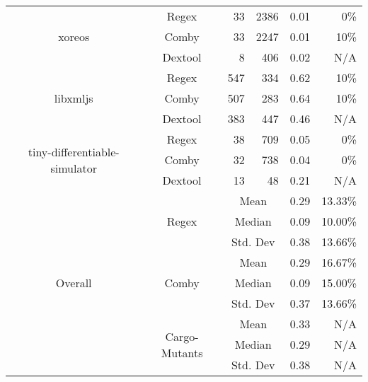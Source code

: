 \documentclass[sigconf,review, anonymous]{acmart}
\begin{document}
{\begin{table}[htbp]
{\begin{tabular}{|c|c|r|r|r|r|}
\multirow{3}{*}{\small xoreos} & Regex & 33 & 2386 & 0.01 & 0\% \\\cline{2-6}
    & Comby & 33 & 2247 & 0.01 & 10\% \\ \cline{2-6}
    & Dextool & 8 & 406 & 0.02 & N/A \\ \hline
\multirow{3}{*}{\small libxmljs} & Regex & 547 & 334 & 0.62 & 10\% \\\cline{2-6}
    & Comby & 507 & 283 & 0.64 & 10\% \\ \cline{2-6}
    & Dextool & 383 & 447 & 0.46 & N/A \\ \hline
\multirow{3}{*}{\small tiny-differentiable-simulator} & Regex & 38 & 709 & 0.05 & 0\% \\\cline{2-6}
    & Comby & 32 & 738 & 0.04 & 0\% \\ \cline{2-6}
    & Dextool & 13 & 48 & 0.21 & N/A\\ \hline
    
\multirow{9}{*}{Overall} & \multirow{3}{*}{Regex} & \multicolumn{2}{c|}{Mean} & 0.29  & 13.33\%\\\cline{3-6}
    &   &  \multicolumn{2}{c|}{Median} & 0.09 & 10.00\% \\\cline{3-6}
    &   &  \multicolumn{2}{c|}{Std. Dev} & 0.38 & 13.66\% \\\cline{2-6}

 & \multirow{3}{*}{Comby} & \multicolumn{2}{c|}{Mean} & 0.29 & 16.67\% \\\cline{3-6}
    &   &  \multicolumn{2}{c|}{Median} & 0.09 & 15.00\% \\\cline{3-6}
    &   &  \multicolumn{2}{c|}{Std. Dev} & 0.37 & 13.66\% \\\cline{2-6}

 & \multirow{3}{*}{Cargo-Mutants} & \multicolumn{2}{c|}{Mean} & 0.33 & N/A\\\cline{3-6}
    &   &  \multicolumn{2}{c|}{Median} & 0.29 & N/A \\\cline{3-6}
    &   &  \multicolumn{2}{c|}{Std. Dev} & 0.38 & N/A \\ \hline
    
    
\end{tabular}
}
\end{table}


\begin{table}[htbp]
\centering
\caption{Java (UniversalMutator vs. PIT vs. LittleDarwin)}
\label{tab:table_java2}
\end{table}}
\end{document}

